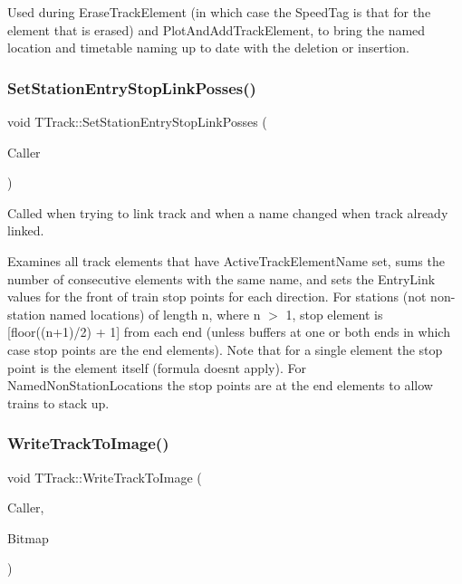 Used during Erase\+Track\+Element (in which case the Speed\+Tag is that for the element that is erased) and Plot\+And\+Add\+Track\+Element, to bring the named location and timetable naming up to date with the deletion or insertion. \mbox{\label{class_t_track_a46b69ee08436c2ff5e41673df04bcf11}} 
\subsubsection{\texorpdfstring{Set\+Station\+Entry\+Stop\+Link\+Posses()}{SetStationEntryStopLinkPosses()}}
{\footnotesize\ttfamily void T\+Track\+::\+Set\+Station\+Entry\+Stop\+Link\+Posses (\begin{DoxyParamCaption}\item[{int}]{Caller }\end{DoxyParamCaption})}

Called when trying to link track and when a name changed when track already linked.

Examines all track elements that have Active\+Track\+Element\+Name set, sums the number of consecutive elements with the same name, and sets the Entry\+Link values for the front of train stop points for each direction. For stations (not non-\/station named locations) of length n, where n $>$ 1, stop element is \mbox{[}floor((n+1)/2) + 1\mbox{]} from each end (unless buffers at one or both ends in which case stop points are the end elements). Note that for a single element the stop point is the element itself (formula doesn\textquotesingle{}t apply). For Named\+Non\+Station\+Locations the stop points are at the end elements to allow trains to stack up. \mbox{\label{class_t_track_ab3530b4af2a4b2a9cd1c1b480a19298d}} 
\subsubsection{\texorpdfstring{Write\+Track\+To\+Image()}{WriteTrackToImage()}}
{\footnotesize\ttfamily void T\+Track\+::\+Write\+Track\+To\+Image (\begin{DoxyParamCaption}\item[{int}]{Caller,  }\item[{Graphics\+::\+T\+Bitmap $\ast$}]{Bitmap }\end{DoxyParamCaption})}

